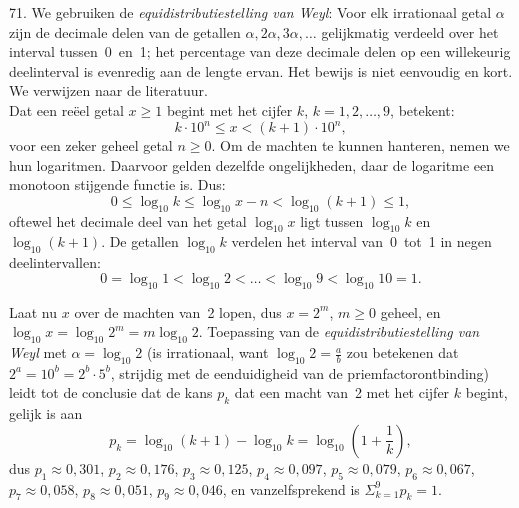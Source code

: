 \clearpage

\begin{problem}{71.}
    We gebruiken de \textit{equidistributiestelling van Weyl}: Voor elk ir\-rationaal getal $\alpha$ zijn de decimale delen van de getallen $\alpha,2 \alpha,3 \alpha,\dotsc$ gelijkmatig verdeeld over het interval tussen~0~en~1; het percentage van deze decimale delen op een willekeurig deelinterval is evenredig aan de lengte ervan. Het bewijs is niet eenvoudig en kort. We verwijzen naar de literatuur.\\

    Dat een reëel getal $x \geq 1$ begint met het cijfer $k$, $k = 1,2,\dotsc,9$, betekent:
    \begin{equation*}
        k \cdot {10}^n \leq x < (k + 1) \cdot {10}^n,
    \end{equation*}
    voor een zeker geheel getal $n \geq 0$. Om de machten te kunnen hanteren, nemen we hun logaritmen. Daarvoor gelden dezelfde ongelijkheden, daar de logaritme een monotoon stijgende functie is. Dus:
    \begin{equation*}
        0 \leq \log_{10} k \leq \log_{10} x - n < \log_{10} (k + 1) \leq 1,
    \end{equation*}
    oftewel het decimale deel van het getal $\log_{10} x$ ligt tussen $\log_{10} k$ en $\log_{10} (k + 1)$. De getallen $\log_{10} k$ verdelen het interval van~0~tot~1 in negen deelintervallen:
    \begin{equation*}
        0 = \log_{10} 1 < \log_{10} 2 < \dots < \log_{10} 9 < \log_{10} 10 = 1.
    \end{equation*}

    Laat nu $x$ over de machten van~2 lopen, dus $x = 2^m$, $m \geq 0$ geheel, en $\log_{10} x = \log_{10} 2^m = m \log_{10} 2$. Toepassing van de \textit{equidistributie\-stelling van Weyl} met $\alpha = \log_{10} 2$ (is irrationaal, want $\log_{10} 2 = \frac{a}{b}$ zou betekenen dat $2^a = {10}^b = 2^b \cdot 5^b$, strijdig met de eenduidigheid van de priemfactorontbinding) leidt tot de conclusie dat de kans $p_k$ dat een macht van~2 met het cijfer $k$ begint, gelijk is aan
    \begin{equation*}
        p_k = \log_{10} (k + 1) - \log_{10} k = \log_{10} \left( 1 + \frac{1}{k} \right),
    \end{equation*}
    dus $p_1 \approx 0{,}301$, $p_2 \approx 0{,}176$, $p_3 \approx 0{,}125$, $p_4 \approx 0{,}097$, $p_5 \approx 0{,}079$, $p_6 \approx 0{,}067$, $p_7 \approx 0{,}058$, $p_8 \approx 0{,}051$, $p_9 \approx 0{,}046$, en vanzelfsprekend is $\Sigma_{k=1}^{9} p_k = 1$.
\end{problem}

